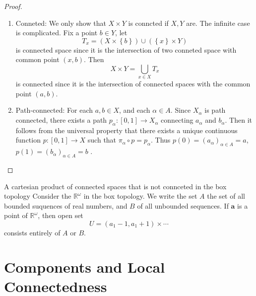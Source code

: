 \documentclass[../main.tex]{subfiles}
\begin{document}
\begin{proof}
    \begin{enumerate}
        \item Conneted:  We only show that \(  X\times Y  \) is conncted if \(  X,Y  \) are. The infinite case is complicated. 
        Fix a point \(  b \in Y  \), let \[
        T_{x}=  \left( X\times \left\{ b \right\} \right)\cup \left( \left\{ x \right\}\times Y \right)  
        \] is connected space since it is the intersection of two conneted space with common point \(  \left( x,b \right)   \). Then \[
        X\times Y= \bigcup _{x \in X} T_{x}
        \] is connected since it is the intersection of connected spaces with the common point \(  \left( a,b \right)   \). 
        \item Path-connected: For each \(  a, b \in X  \), and each \(  \alpha  \in A  \). Since \(  X_{\alpha  }  \) is path connected, there exists a path \(  p_{\alpha } :\left[ 0,1 \right]\to X_{\alpha }  \) connecting \(  a_{\alpha }  \) and \(  b_{\alpha }  \). Then it follows from the universal property that there exists a unique continuous function \(  p:\left[ 0,1 \right]\to X   \) such that \(   \pi_{\alpha }\circ p= p_{\alpha }  \). Thus \(  p\left( 0 \right)= \left( a_{\alpha } \right)_{\alpha \in A}= a    \), \(  p\left( 1 \right)= \left( b_{\alpha } \right)_{\alpha \in A}= b    \)          .
    \end{enumerate}
    
\end{proof}

\begin{example}{A cartesian product of connected spaces that is not connceted in the box topology}{}
    Consider the \(  \mathbb{R} ^{ \omega }  \) in the box topology. We write the set \(  A  \) the set of all bounded suquences of real numbers, and \(  B  \) of all unbounded sequences. If \(  \mathbf{a}  \) is a point of \(  \mathbb{R} ^{ \omega }  \), then open set \[
    U= \left( a_1-1,a_1+ 1 \right)\times \cdots  
    \] consists entirely of \(  A  \) or \(  B  \).     
\end{example}

\section{Components and Local Connectedness }
\end{document}

